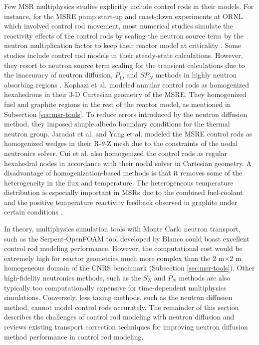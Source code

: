 Few \gls{MSR} multiphysics studies explicitly include control rods in their models. For instance,
for the \gls{MSRE} pump start-up and coast-down experiments at \gls{ORNL} which involved control
rod movement, most numerical studies simulate the reactivity effects of the control rods by scaling
the neutron source term by the neutron multiplication factor to keep their reactor model at
criticality \cite{delpech_benchmark_2003, krepel_dyn3d-msr_2007}. Some studies include control rod
models in their steady-state calculations. However, they resort to neutron source term scaling for
the transient calculations due to the inaccuracy of neutron diffusion, $P_1$, and $SP_N$ methods in
highly neutron absorbing regions \cite{kophazi_development_2009, jaradat_development_2021,
yang_development_2022}. Kophazi et al. \cite{kophazi_development_2009} modeled annular control rods
as homogenized hexahedrons in their 3-D Cartesian geometry of the \gls{MSRE}. They
homogenized fuel and graphite regions in the rest of the reactor model, as mentioned in Subsection
\ref{sec:msr-tools}. To reduce errors introduced by the neutron diffusion method, they imposed
simple albedo boundary conditions for the thermal neutron group. Jaradat et al.
\cite{jaradat_development_2021} and Yang et al. \cite{yang_development_2022} modeled the \gls{MSRE}
control rods as homogenized wedges in their R-$\theta$-Z mesh due to the constraints of the nodal
neutronics solver. Cui et al. \cite{cui_development_2021} also homogenized the control rods as
regular hexahedral nodes in accordance with their nodal solver in Cartesian geometry. A disadvantage
of homogenization-based methods is that it removes some of the heterogeneity in the flux and
temperature. The heterogeneous temperature distribution is especially important in \glspl{MSR} due
to the combined fuel-coolant and the positive temperature reactivity feedback observed
in graphite under certain conditions \cite{mathieu_thorium_2006}.

In theory, multiphysics simulation tools with Monte Carlo neutron transport, such as the
Serpent-OpenFOAM tool developed by Blanco \cite{blanco_neutronic_2020} could boast excellent
control rod modeling performance. However, the computational cost would be extremely high for
reactor geometries much more complex than the 2 m$\times$2 m homogeneous domain of the CNRS
benchmark (Subsection \ref{sec:msr-tools}). Other high-fidelity neutronics methods, such as the
$S_N$ and $P_N$ methods are also typically too computationally expensive for time-dependent
multiphysics simulations. Conversely, less taxing methods, such as the neutron diffusion
method, cannot model control rods accurately. The remainder of this section describes the
challenges of control rod modeling with neutron diffusion and reviews existing transport
correction techniques for improving neutron diffusion method performance in control rod modeling.

